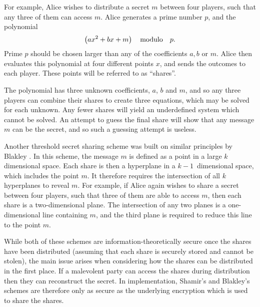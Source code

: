 For example, Alice wishes to distribute a secret $m$ between four players, such that any three of them can access $m$. Alice generates a prime number $p$, and the polynomial 
\begin{equation}
\left( a x^2 + b x + m \right) \qq{modulo} p.
\end{equation}
Prime $p$ should be chosen larger than any of the coefficients $a, b$ or $m$. Alice then evaluates this polynomial at four different points $x$, and sends the outcomes to each player. These points will be referred to as ``shares''. %

The polynomial has three unknown coefficients, $a$, $b$ and $m$, and so any three players can combine their shares to create three equations, which may be solved for each unknown. Any fewer shares will yield an underdefined system which cannot be solved. An attempt to guess the final share will show that any message $m$ can be the secret, and so such a guessing attempt is useless.

Another threshold secret sharing scheme was built on similar principles by Blakley \cite{Blakley1979}. In this scheme, the message $m$ is defined as a point in a large $k$ dimensional space. Each share is then a hyperplane in a $k-1$~dimensional space, which includes the point $m$. It therefore requires the intersection of all $k$ hyperplanes to reveal $m$. For example, if Alice again wishes to share a secret between four players, such that three of them are able to access $m$, then each share is a two-dimensional plane. The intersection of any two planes is a one-dimensional line containing $m$, and the third plane is required to reduce this line to the point $m$.

While both of these schemes are information-theoretically secure once the shares have been distributed (assuming that each share is securely stored and cannot be stolen), the main issue arises when considering how the shares can be distributed in the first place. If a malevolent party can access the shares during distribution then they can reconstruct the secret. In implementation, Shamir's and Blakley's schemes are therefore only as secure as the underlying encryption which is used to share the shares.

%


